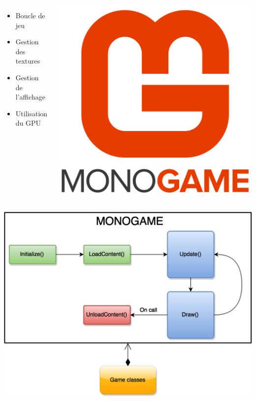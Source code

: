 \documentclass{beamer}
\begin{document}
\begin{frame}
\begin{columns}
\begin{itemize}
	\item Boucle de jeu
	\item Gestion des textures
	\item Gestion de l'affichage
	\item Utilisation du GPU
\end{itemize}
\begin{center}
\includegraphics[width=.75\textwidth]{img/pres_monogame_logo.png}
\end{center}
\end{columns}
\end{frame}

\begin{frame}
\begin{center}
\includegraphics[width=.85\textwidth]{img/pres_boucles.png}\\
\end{center}
\end{frame}
\end{document}
